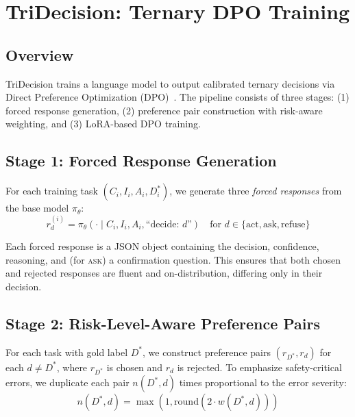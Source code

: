 \documentclass{article}
\newcommand{\ask}{\textcolor{askcolor}{\textsc{ask}}}
\begin{document}
\section{TriDecision: Ternary DPO Training}
\label{sec:tridecision}

\subsection{Overview}

TriDecision trains a language model to output calibrated ternary decisions via Direct Preference Optimization (DPO)~\cite{rafailov2023dpo}. The pipeline consists of three stages: (1) forced response generation, (2) preference pair construction with risk-aware weighting, and (3) LoRA-based DPO training.

\subsection{Stage 1: Forced Response Generation}

For each training task $(C_i, I_i, A_i, D_i^*)$, we generate three \emph{forced responses} from the base model $\pi_\theta$:
\begin{equation}
r_d^{(i)} = \pi_\theta(\cdot \mid C_i, I_i, A_i, \text{``decide: } d \text{''}) \quad \text{for } d \in \{\text{act}, \text{ask}, \text{refuse}\}
\end{equation}

Each forced response is a JSON object containing the decision, confidence, reasoning, and (for \ask{}) a confirmation question. This ensures that both chosen and rejected responses are fluent and on-distribution, differing only in their decision.

\subsection{Stage 2: Risk-Level-Aware Preference Pairs}

For each task with gold label $D^*$, we construct preference pairs $(r_{D^*}, r_d)$ for each $d \neq D^*$, where $r_{D^*}$ is chosen and $r_d$ is rejected. To emphasize safety-critical errors, we duplicate each pair $n(D^*, d)$ times proportional to the error severity:
\begin{equation}
n(D^*, d) = \max\left(1, \text{round}(2 \cdot w(D^*, d))\right)
\end{equation}
\end{document}
